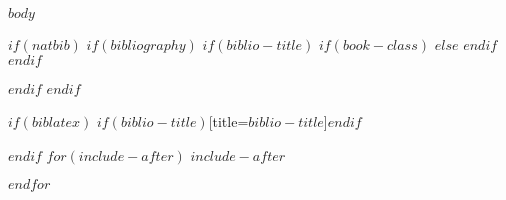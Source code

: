 \documentclass[$if(fontsize)$$fontsize$,$endif$$if(lang)$$babel-lang$,$endif$$if(papersize)$$papersize$paper,$endif$$for(classoption)$$classoption$$sep$,$endfor$]{$documentclass$}
\begin{document}
$body$


\singlespacing

\setlength{\bibsep}{$fontsize$}

$if(natbib)$
$if(bibliography)$
$if(biblio-title)$
$if(book-class)$
\renewcommand\bibname{$biblio-title$}
$else$
\renewcommand\refname{$biblio-title$}
$endif$
$endif$


$endif$
$endif$

$if(biblatex)$
\printbibliography$if(biblio-title)$[title=$biblio-title$]$endif$

$endif$
$for(include-after)$
$include-after$

$endfor$
\end{document}
